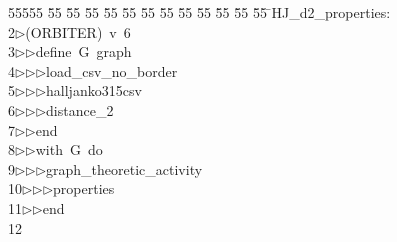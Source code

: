 %
%
\begin{tabbing}
55555 \= 55 \= 55 \= 55 \= 55 \= 55 \= 55 \= 55 \= 55 \= 55 \= 55 \= 55 \= 55 \= \>HJ\_d2\_properties:\\[0pt]
2\>$\triangleright$\>(ORBITER)\ v\ 6\ \\[0pt]
3\>$\triangleright$\>$\triangleright$\>define\ G\ graph\ \\[0pt]
4\>$\triangleright$\>$\triangleright$\>$\triangleright$\>load\_csv\_no\_border\ \\[0pt]
5\>$\triangleright$\>$\triangleright$\>$\triangleright$\>halljanko315csv\ \\[0pt]
6\>$\triangleright$\>$\triangleright$\>$\triangleright$\>distance\_2\ \\[0pt]
7\>$\triangleright$\>$\triangleright$\>end\ \\[0pt]
8\>$\triangleright$\>$\triangleright$\>with\ G\ do\ \\[0pt]
9\>$\triangleright$\>$\triangleright$\>$\triangleright$\>graph\_theoretic\_activity\ \\[0pt]
10\>$\triangleright$\>$\triangleright$\>$\triangleright$\>properties\ \\[0pt]
11\>$\triangleright$\>$\triangleright$\>end\\[0pt]
12\>\end{tabbing}
